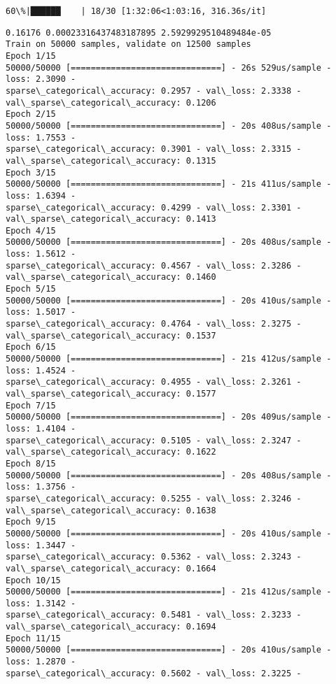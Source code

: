 \documentclass[11pt]{article}
\begin{document}
    \begin{Verbatim}[commandchars=\\\{\}]
 60\%|██████    | 18/30 [1:32:06<1:03:16, 316.36s/it]
    \end{Verbatim}

    \begin{Verbatim}[commandchars=\\\{\}]
0.16176 0.00023316437483187895 2.5929929510489484e-05
Train on 50000 samples, validate on 12500 samples
Epoch 1/15
50000/50000 [==============================] - 26s 529us/sample - loss: 2.3090 -
sparse\_categorical\_accuracy: 0.2957 - val\_loss: 2.3338 -
val\_sparse\_categorical\_accuracy: 0.1206
Epoch 2/15
50000/50000 [==============================] - 20s 408us/sample - loss: 1.7553 -
sparse\_categorical\_accuracy: 0.3901 - val\_loss: 2.3315 -
val\_sparse\_categorical\_accuracy: 0.1315
Epoch 3/15
50000/50000 [==============================] - 21s 411us/sample - loss: 1.6394 -
sparse\_categorical\_accuracy: 0.4299 - val\_loss: 2.3301 -
val\_sparse\_categorical\_accuracy: 0.1413
Epoch 4/15
50000/50000 [==============================] - 20s 408us/sample - loss: 1.5612 -
sparse\_categorical\_accuracy: 0.4567 - val\_loss: 2.3286 -
val\_sparse\_categorical\_accuracy: 0.1460
Epoch 5/15
50000/50000 [==============================] - 20s 410us/sample - loss: 1.5017 -
sparse\_categorical\_accuracy: 0.4764 - val\_loss: 2.3275 -
val\_sparse\_categorical\_accuracy: 0.1537
Epoch 6/15
50000/50000 [==============================] - 21s 412us/sample - loss: 1.4524 -
sparse\_categorical\_accuracy: 0.4955 - val\_loss: 2.3261 -
val\_sparse\_categorical\_accuracy: 0.1577
Epoch 7/15
50000/50000 [==============================] - 20s 409us/sample - loss: 1.4104 -
sparse\_categorical\_accuracy: 0.5105 - val\_loss: 2.3247 -
val\_sparse\_categorical\_accuracy: 0.1622
Epoch 8/15
50000/50000 [==============================] - 20s 408us/sample - loss: 1.3756 -
sparse\_categorical\_accuracy: 0.5255 - val\_loss: 2.3246 -
val\_sparse\_categorical\_accuracy: 0.1638
Epoch 9/15
50000/50000 [==============================] - 20s 410us/sample - loss: 1.3447 -
sparse\_categorical\_accuracy: 0.5362 - val\_loss: 2.3243 -
val\_sparse\_categorical\_accuracy: 0.1664
Epoch 10/15
50000/50000 [==============================] - 21s 412us/sample - loss: 1.3142 -
sparse\_categorical\_accuracy: 0.5481 - val\_loss: 2.3233 -
val\_sparse\_categorical\_accuracy: 0.1694
Epoch 11/15
50000/50000 [==============================] - 20s 410us/sample - loss: 1.2870 -
sparse\_categorical\_accuracy: 0.5602 - val\_loss: 2.3225 -

\end{Verbatim}
\end{document}
